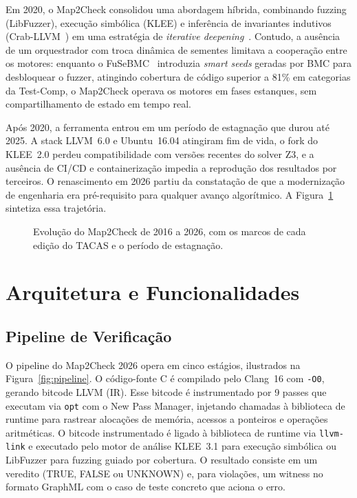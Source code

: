 \documentclass[12pt]{article}
\newcommand{\CountPasses}{9}
\newcommand{\LLVMVersion}{16}
\newcommand{\KLEEVersion}{3.1}
\begin{document}
Em 2020, o Map2Check consolidou uma abordagem híbrida, combinando fuzzing (LibFuzzer), execução simbólica (KLEE) e inferência de invariantes indutivos (Crab-LLVM~\cite{crabllvm2021}) em uma estratégia de \textit{iterative deepening}~\cite{map2check2020}. Contudo, a ausência de um orquestrador com troca dinâmica de sementes limitava a cooperação entre os motores: enquanto o FuSeBMC~\cite{fusebmc2022} introduzia \textit{smart seeds} geradas por BMC para desbloquear o fuzzer, atingindo cobertura de código superior a 81\% em categorias da Test-Comp, o Map2Check operava os motores em fases estanques,
sem compartilhamento de estado em tempo real.

Após 2020, a ferramenta entrou em um período de estagnação que durou até 2025. A stack LLVM~6.0 e Ubuntu~16.04 atingiram fim de vida, o fork do KLEE~2.0 perdeu compatibilidade com versões recentes do solver Z3, e a ausência de CI/CD e containerização impedia a reprodução dos resultados por terceiros. O renascimento em 2026 partiu da constatação de que a modernização de engenharia era pré-requisito para qualquer avanço algorítmico. A Figura~\ref{fig:timeline} sintetiza essa trajetória.

\begin{figure}[ht]
\centering

\caption{Evolução do Map2Check de 2016 a 2026, com os marcos de cada edição do TACAS e o período de estagnação.}
\label{fig:timeline}
\end{figure}


\section{Arquitetura e Funcionalidades}
\label{sec:arquitetura}

\subsection{Pipeline de Verificação}
\label{subsec:pipeline}

O pipeline do Map2Check 2026 opera em cinco estágios, ilustrados na Figura~\ref{fig:pipeline}. O código-fonte C é compilado pelo Clang~\LLVMVersion{} com \texttt{-O0}, gerando bitcode LLVM (IR). Esse bitcode é instrumentado por \CountPasses{} passes que executam via \texttt{opt} com o New Pass Manager, injetando chamadas à biblioteca de runtime para rastrear alocações de memória, acessos a ponteiros e operações aritméticas. O bitcode instrumentado é ligado à biblioteca de runtime via \texttt{llvm-link} e executado pelo motor de análise KLEE~\KLEEVersion{} para execução simbólica ou LibFuzzer para fuzzing guiado por cobertura. O resultado consiste em um veredito (TRUE, FALSE ou UNKNOWN) e, para violações, um witness no formato GraphML com o caso de teste concreto que aciona o erro.
\end{document}
